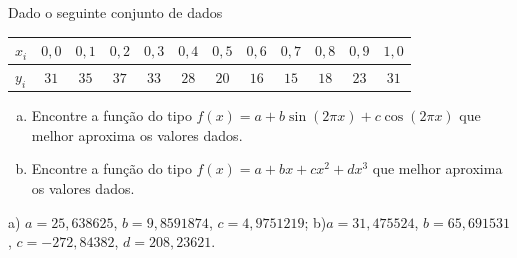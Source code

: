 \begin{exer} Dado o seguinte conjunto de dados
  \begin{center}
    \begin{tabular}{l|ccccccccccc}
      $x_i$ & $0,0$ & $0,1$ & $0,2$ & $0,3$ & $0,4$ & $0,5$ & $0,6$ & $0,7$ & $0,8$ & $0,9$ & $1,0$\\\hline
      $y_i$ & $31$ & $35$ & $37$ & $33$ & $28$ & $20$ & $16$ & $15$ & $18$ & $23$ & $31$
    \end{tabular}
  \end{center}
\begin{enumerate}[a)]
\item Encontre a função do tipo $f(x)=a+b\sin(2\pi x)+c\cos(2\pi x)$ que melhor aproxima os valores dados.
\item Encontre a função do tipo $f(x)=a+bx+cx^2+dx^3$ que melhor aproxima os valores dados.
\end{enumerate}
\end{exer}
\begin{resp}
    a) $a=25,638625$, $b=9,8591874$, $c=4,9751219$; b)$a=31,475524$, $b=65,691531$, $c=-272,84382$, $d=208,23621$.
\end{resp}










